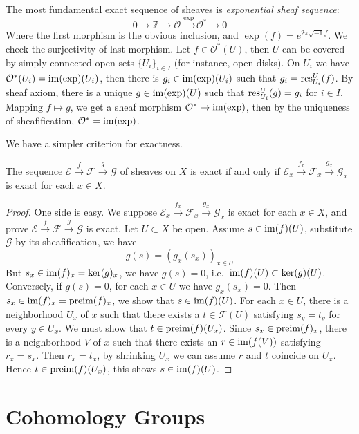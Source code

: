 \begin{eg}
    The most fundamental exact sequence of sheaves is \emph{exponential sheaf sequence}:
    \[0\to\mathbb{Z}\to\mathcal{O}\xrightarrow{\exp}\mathcal{O}^*\to 0\]
    Where the first morphism is the obvious inclusion, and $\exp(f)=e^{2\pi\sqrt{-1}f}$.
    We check the surjectivity of last morphism.
    Let $f\in\mathcal{O}^*(U)$, then $U$ can be covered by simply connected open sets $\{U_i\}_{i\in I}$ (for instance, open disks).
    On $U_i$ we have $\mathcal{O}^*(U_i)=\operatorname{im}(\exp)(U_i)$, then there is $g_i\in\operatorname{im}(\exp)(U_i)$ such that $g_i=\operatorname{res}^U_{U_i}(f)$.
    By sheaf axiom, there is a unique $g\in\operatorname{im}(\exp)(U)$ such that $\operatorname{res}^U_{U_i}(g)=g_i$ for $i\in I$.
    Mapping $f\mapsto g$, we get a sheaf morphism $\mathcal{O}^*\to\operatorname{im}(\exp)$, then by the uniqueness of sheafification, $\mathcal{O}^*=\operatorname{im}(\exp)$.
\end{eg}

We have a simpler criterion for exactness.
\begin{prop}\label{exactness of sheaves}
    The sequence $\mathcal{E}\xrightarrow{f}\mathcal{F}\xrightarrow{g}\mathcal{G}$ of sheaves on $X$ is exact if and only if $\mathcal{E}_x\xrightarrow{f_x}\mathcal{F}_x\xrightarrow{g_x}\mathcal{G}_x$ is exact for each $x\in X$.
\end{prop}
\begin{proof}
    One side is easy.
    We suppose $\mathcal{E}_x\xrightarrow{f_x}\mathcal{F}_x\xrightarrow{g_x}\mathcal{G}_x$ is exact for each $x\in X$, and prove $\mathcal{E}\xrightarrow{f}\mathcal{F}\xrightarrow{g}\mathcal{G}$ is exact.
    Let $U\subset X$ be open.
    Assume $s\in\operatorname{im}(f)(U)$, substitute $\mathcal{G}$ by its sheafification, we have
    \[g(s)=(g_x(s_x))_{x\in U}\]
    But $s_x\in\operatorname{im}(f)_x=\ker(g)_x$, we have $g(s)=0$, i.e.\ $\operatorname{im}(f)(U)\subset\ker(g)(U)$.
    Conversely, if $g(s)=0$, for each $x\in U$ we have $g_x(s_x)=0$.
    Then $s_x\in\operatorname{im}(f)_x=\operatorname{preim}(f)_x$, we show that $s\in\operatorname{im}(f)(U)$.
    For each $x\in U$, there is a neighborhood $U_x$ of $x$ such that there exists a $t\in\mathcal{F}(U)$ satisfying $s_y=t_y$ for every $y\in U_x$.
    We must show that $t\in\operatorname{preim}(f)(U_x)$.
    Since $s_x\in\operatorname{preim}(f)_x$, there is a neighborhood $V$ of $x$ such that there exists an $r\in\operatorname{im}(f(V))$ satisfying $r_x=s_x$.
    Then $r_x=t_x$, by shrinking $U_x$ we can assume $r$ and $t$ coincide on $U_x$.
    Hence $t\in\operatorname{preim}(f)(U_x)$, this shows $s\in\operatorname{im}(f)(U)$.
\end{proof}

\section{Cohomology Groups}

